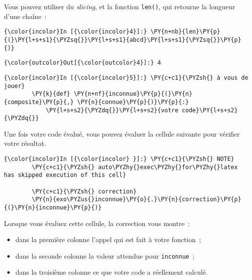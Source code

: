     Vous pouvez utiliser du \emph{slicing}, et la fonction \texttt{len()},
qui retourne la longueur d'une chaîne~:

    \begin{Verbatim}[commandchars=\\\{\},frame=single,framerule=0.3mm,rulecolor=\color{cellframecolor}]
{\color{incolor}In [{\color{incolor}4}]:} \PY{n+nb}{len}\PY{p}{(}\PY{l+s+s1}{\PYZsq{}}\PY{l+s+s1}{abcd}\PY{l+s+s1}{\PYZsq{}}\PY{p}{)}
\end{Verbatim}


\begin{Verbatim}[commandchars=\\\{\},frame=single,framerule=0.3mm,rulecolor=\color{cellframecolor}]
{\color{outcolor}Out[{\color{outcolor}4}]:} 4
\end{Verbatim}
            
    \begin{Verbatim}[commandchars=\\\{\},frame=single,framerule=0.3mm,rulecolor=\color{cellframecolor}]
{\color{incolor}In [{\color{incolor}5}]:} \PY{c+c1}{\PYZsh{} à vous de jouer}
        \PY{k}{def} \PY{n+nf}{inconnue}\PY{p}{(}\PY{n}{composite}\PY{p}{,} \PY{n}{connue}\PY{p}{)}\PY{p}{:}
            \PY{l+s+s2}{\PYZdq{}}\PY{l+s+s2}{votre code}\PY{l+s+s2}{\PYZdq{}}
\end{Verbatim}


    Une fois votre code évalué, vous pouvez évaluer la cellule suivante pour
vérifier votre résultat.

    \begin{Verbatim}[commandchars=\\\{\},frame=single,framerule=0.3mm,rulecolor=\color{cellframecolor}]
{\color{incolor}In [{\color{incolor} }]:} \PY{c+c1}{\PYZsh{} NOTE}
        \PY{c+c1}{\PYZsh{} auto\PYZhy{}exec\PYZhy{}for\PYZhy{}latex has skipped execution of this cell}
        
        \PY{c+c1}{\PYZsh{} correction}
        \PY{n}{exo\PYZus{}inconnue}\PY{o}{.}\PY{n}{correction}\PY{p}{(}\PY{n}{inconnue}\PY{p}{)}
\end{Verbatim}


    Lorsque vous évaluez cette cellule, la correction vous montre~:

\begin{itemize}
\tightlist
\item
  dans la première colonne l'appel qui est fait à votre fonction~;
\item
  dans la seconde colonne la valeur attendue pour \texttt{inconnue}~;
\item
  dans la troisième colonne ce que votre code a réellement calculé.
\end{itemize}

